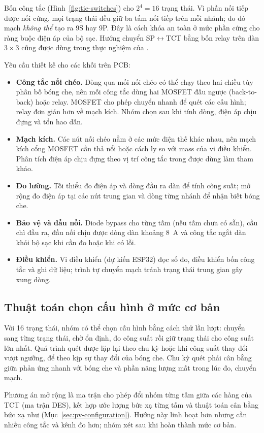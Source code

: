 Bốn công tắc (Hình~\ref{fig:tie-switches}) cho \(2^4=16\) trạng thái. Vì phần nối tiếp được nối cứng, mọi trạng thái đều giữ ba tấm nối tiếp trên mỗi nhánh; do đó mạch \emph{không thể} tạo ra 9S hay 9P. Đây là cách khóa an toàn ở mức phần cứng cho ràng buộc điện áp của bộ sạc. Hướng chuyển SP\(\leftrightarrow\)TCT bằng bốn relay trên dàn \(3\times3\) cũng được dùng trong thực nghiệm của \cite{pachauri}.

Yêu cầu thiết kế cho các khối trên PCB:

\begin{itemize}
    \item \textbf{Công tắc nối chéo.} Dòng qua mối nối chéo có thể chạy theo hai chiều tùy phân bố bóng che, nên mỗi công tắc dùng hai MOSFET đấu ngược (back-to-back) hoặc relay. MOSFET cho phép chuyển nhanh để quét các cấu hình; relay đơn giản hơn về mạch kích. Nhóm chọn sau khi tính dòng, điện áp chịu đựng và tổn hao dẫn.
    \item \textbf{Mạch kích.} Các nút nối chéo nằm ở các mức điện thế khác nhau, nên mạch kích cổng MOSFET cần thả nổi hoặc cách ly so với mass của vi điều khiển. Phân tích điện áp chịu đựng theo vị trí công tắc trong \cite{ngertugrul} được dùng làm tham khảo.
    \item \textbf{Đo lường.} Tối thiểu đo điện áp và dòng đầu ra dàn để tính công suất; mở rộng đo điện áp tại các nút trung gian và dòng từng nhánh để nhận biết bóng che.
    \item \textbf{Bảo vệ và đấu nối.} Diode bypass cho từng tấm (nếu tấm chưa có sẵn), cầu chì đầu ra, đầu nối chịu được dòng dàn khoảng 8~A và công tắc ngắt dàn khỏi bộ sạc khi cần đo hoặc khi có lỗi.
    \item \textbf{Điều khiển.} Vi điều khiển (dự kiến ESP32) đọc số đo, điều khiển bốn công tắc và ghi dữ liệu; trình tự chuyển mạch tránh trạng thái trung gian gây xung dòng.
\end{itemize}

\subsection{Thuật toán chọn cấu hình ở mức cơ bản}

Với 16 trạng thái, nhóm có thể chọn cấu hình bằng cách thử lần lượt: chuyển sang từng trạng thái, chờ ổn định, đo công suất rồi giữ trạng thái cho công suất lớn nhất. Quá trình quét được lặp lại theo chu kỳ hoặc khi công suất thay đổi vượt ngưỡng, để theo kịp sự thay đổi của bóng che. Chu kỳ quét phải cân bằng giữa phản ứng nhanh với bóng che và phần năng lượng mất trong lúc đo, chuyển mạch.

Phương án mở rộng là ma trận cho phép đổi nhóm từng tấm giữa các hàng của TCT (ma trận DES), kết hợp ước lượng bức xạ từng tấm và thuật toán cân bằng bức xạ như \cite{thanh} (Mục~\ref{sec:pv-configuration}). Hướng này linh hoạt hơn nhưng cần nhiều công tắc và kênh đo hơn; nhóm xét sau khi hoàn thành mức cơ bản.
